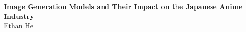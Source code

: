 \documentclass[12pt]{article}
\begin{document}
\begin{flushleft}


{\Large\bf Image Generation Models and Their Impact on the Japanese Anime Industry} \\
Ethan He \\

\setlength{\parindent}{0.5in}






\newpage
\printbibliography[heading=subbibliography]

\end{flushleft}
\end{document}
